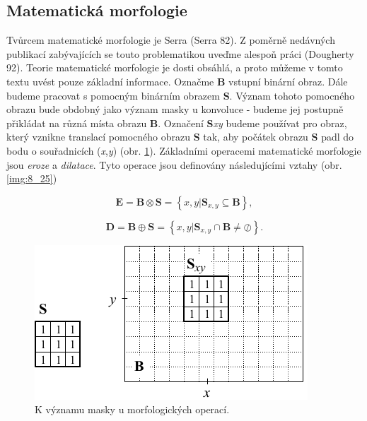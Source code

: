 \subsection*{Matematická morfologie}

Tvůrcem matematické morfologie je Serra (Serra 82). Z poměrně nedávných publikací zabývajících se touto problematikou uveďme alespoň práci (Dougherty 92). Teorie matematické morfologie je dosti obsáhlá, a proto můžeme v tomto textu uvést pouze základní informace. Označme \textbf{B} vstupní binární obraz. Dále budeme pracovat s pomocným binárním obrazem \textbf{S}. Význam tohoto pomocného obrazu bude obdobný jako význam masky u konvoluce - budeme jej postupně přikládat na různá místa obrazu \textbf{B}. Označení \textbf{S}\textit{xy} budeme používat pro obraz, který vznikne translací pomocného obrazu \textbf{S} tak, aby počátek obrazu \textbf{S} padl do bodu o souřadnicích (\textit{x},\textit{y}) (obr. \ref{img:8_24}).  Základními operacemi matematické morfologie jsou \textit{eroze} a \textit{dilatace}. Tyto operace jsou definovány následujícími vztahy (obr. \ref{img:8_25})

\begin{equation} \label{eq:8_85}
    \mathbf{E} = \mathbf{B} \otimes \mathbf{S} = \left\{ x, y | \mathbf{S}_{x, y} \subseteq \mathbf{B} \right\},
\end{equation}

\begin{equation} \label{eq:8_86}
    \mathbf{D} = \mathbf{B} \oplus \mathbf{S} = \left\{ x, y | \mathbf{S}_{x, y} \cap \mathbf{B} \neq \oslash \right\}.
\end{equation}

\begin{figure}[th]
    \begin{center}
        \includegraphics[scale=0.9]{08_segmentace/images/img_8_24.pdf}
    \end{center}
    \caption{K významu masky u morfologických operací.}
    \label{img:8_24}
\end{figure}


